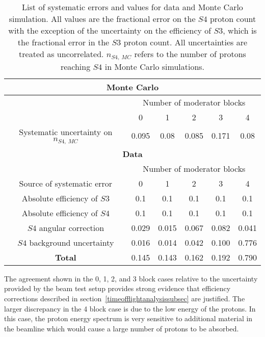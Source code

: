 \begin{table}
	\centering
	\caption{List of systematic errors and values for data and Monte Carlo simulation. All values are the fractional error on the $\mathit{S4}$ proton count with the exception of the uncertainty on the efficiency of $\mathit{S3}$, which is the fractional error in the $\mathit{S3}$ proton count. All uncertainties are treated as uncorrelated. $n_{\mathit{S4},~MC}$ refers to the number of protons reaching $\mathit{S4}$ in Monte Carlo simulations.}
	\begin{tabular}{|c|c c c c c|}
		\hline 
		\multicolumn{6}{|c|}{\textbf{Monte Carlo}} \\
		\hline
		& \multicolumn{5}{c|}{Number of moderator blocks} \\
		& 0 & 1 & 2 & 3 & 4 \\
		\hline
		Systematic uncertainty on $n_{\mathit{S4},~MC}$ & 0.095 & 0.08 & 0.085 & 0.171 & 0.08 \\
		\hline
		\hline
		\multicolumn{6}{|c|}{\textbf{Data}} \\
		\hline
		& \multicolumn{5}{c|}{Number of moderator blocks} \\
		Source of systematic error & 0 & 1 & 2 & 3 & 4 \\
		\hline
		Absolute efficiency of $\mathit{S3}$ & 0.1 & 0.1 & 0.1 & 0.1 & 0.1 \\
		Absolute efficiency of $\mathit{S4}$ & 0.1 & 0.1 & 0.1 & 0.1 & 0.1 \\ 
		$\mathit{S4}$ angular correction & 0.029 & 0.015 & 0.067 & 0.082 & 0.041 \\
		$\mathit{S4}$ background uncertainty & 0.016 & 0.014 & 0.042 & 0.100 & 0.776 \\
		\hline
		\textbf{Total} & 0.145 & 0.143 & 0.162 & 0.192 & 0.790 \\
		\hline 
	\end{tabular}
	\label{tab:systematics}
\end{table}

The agreement shown in the 0, 1, 2, and 3 block cases relative to the uncertainty provided by the beam test setup provides strong evidence that efficiency corrections described in section~\ref{timeofflightanalysissubsec} are justified.
The larger discrepancy in the 4 block case is due to the low energy of the protons.
In this case, the proton energy spectrum is very sensitive to additional material in the beamline which would cause a large number of protons to be absorbed.

